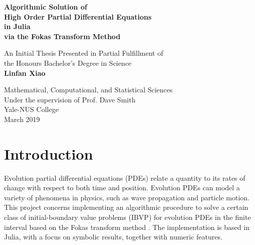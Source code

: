 \documentclass[11pt, oneside, a4paper]{article}
\begin{document}
\begin{titlepage}
\begin{center}
\vspace{1cm}
\huge
\textbf{Algorithmic Solution of\\ High Order Partial Differential Equations\\
in Julia\\ via the Fokas Transform Method}

\LARGE
\vspace{.5cm}
An Initial Thesis Presented in Partial Fulfillment of\\ the Honours Bachelor's Degree in Science\\
\vspace{.5cm}
\textbf{Linfan Xiao}\\
\vspace{.5cm}
\Large
\vspace{.5cm}
\Large
\end{center}

\vfill
\begin{center}	
Mathematical, Computational, and Statistical Sciences\\
Under the supervision of Prof. Dave Smith\\
Yale-NUS College\\
March 2019\\
\end{center}
\end{titlepage}
\tableofcontents
\listoffigures
\listoftables
\pagebreak
{}

\pagebreak
{}

\section{Introduction}
Evolution partial differential equations (PDEs) relate a quantity to its rates of change with respect to both time and position. Evolution PDEs can model a variety of phenomena in physics, such as wave propagation and particle motion. This project concerns implementing an algorithmic procedure to solve a certain class of initial-boundary value problems (IBVP) for evolution PDEs in the finite interval \cite{Smith2016} based on the Fokas transform method \cite{Fokas2008}. The implementation is based in Julia, with a focus on symbolic results, together with numeric features.
\end{document}
